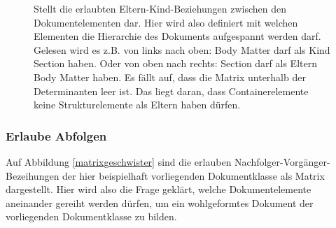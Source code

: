 
\begin{figure}[h!]
\centering
\advance\leftskip-2.5cm
\caption[Matrix über Eltern-Kind-Beziehungen]{ Stellt die erlaubten Eltern-Kind-Beziehungen zwischen den Dokumentelementen dar. Hier wird also definiert mit welchen Elementen die Hierarchie des Dokuments aufgespannt werden darf. Gelesen wird es z.B. von links nach oben: Body Matter darf als Kind Section haben. Oder von oben nach rechts: Section darf als Eltern Body Matter haben. Es fällt auf, dass die Matrix unterhalb der Determinanten leer ist. Das liegt daran, dass Containerelemente keine Strukturelemente als Eltern haben dürfen. }\label{matrixkind}
\end{figure}
 
\subsubsection{Erlaube Abfolgen}\label{}

 
Auf Abbildung \ref{matrixgeschwister} sind die erlauben Nachfolger-Vorgänger-Bezeihungen der hier beispielhaft vorliegenden Dokumentklasse als Matrix dargestellt. Hier wird also die Frage geklärt, welche Dokumentelemente aneinander gereiht werden dürfen, um ein wohlgeformtes Dokument der vorliegenden Dokumentklasse zu bilden.

